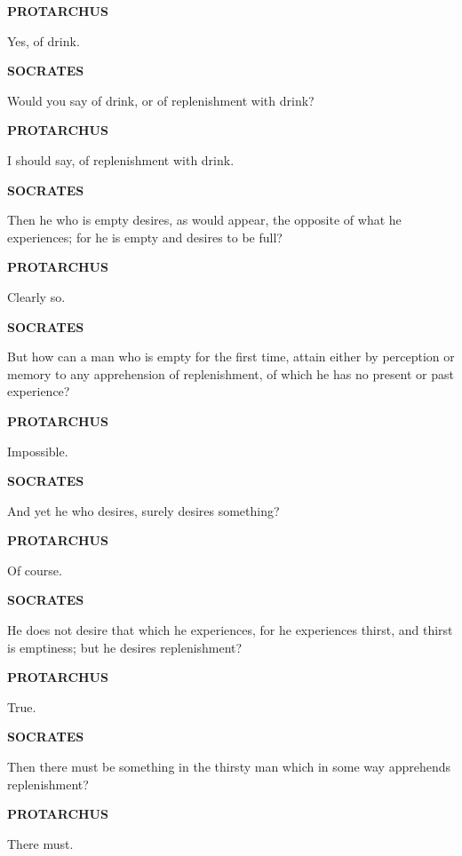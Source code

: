 \documentclass[11pt,letter]{article}
\begin{document}
\par \textbf{PROTARCHUS}
\par   Yes, of drink.

\par \textbf{SOCRATES}
\par   Would you say of drink, or of replenishment with drink?

\par \textbf{PROTARCHUS}
\par   I should say, of replenishment with drink.

\par \textbf{SOCRATES}
\par   Then he who is empty desires, as would appear, the opposite of what he experiences; for he is empty and desires to be full?

\par \textbf{PROTARCHUS}
\par   Clearly so.

\par \textbf{SOCRATES}
\par   But how can a man who is empty for the first time, attain either by perception or memory to any apprehension of replenishment, of which he has no present or past experience?

\par \textbf{PROTARCHUS}
\par   Impossible.

\par \textbf{SOCRATES}
\par   And yet he who desires, surely desires something?

\par \textbf{PROTARCHUS}
\par   Of course.

\par \textbf{SOCRATES}
\par   He does not desire that which he experiences, for he experiences thirst, and thirst is emptiness; but he desires replenishment?

\par \textbf{PROTARCHUS}
\par   True.

\par \textbf{SOCRATES}
\par   Then there must be something in the thirsty man which in some way apprehends replenishment?

\par \textbf{PROTARCHUS}
\par   There must.
\end{document}
